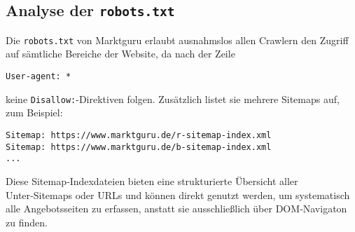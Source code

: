 \subsection{Analyse der \texttt{robots.txt}}
Die \texttt{robots.txt} von Marktguru erlaubt ausnahmslos allen Crawlern den Zugriff auf sämtliche Bereiche der Website, da nach der Zeile
\begin{verbatim}
User-agent: *
\end{verbatim}
keine \texttt{Disallow:}-Direktiven folgen. Zusätzlich listet sie mehrere Sitemaps auf, zum Beispiel:
\begin{verbatim}
Sitemap: https://www.marktguru.de/r-sitemap-index.xml
Sitemap: https://www.marktguru.de/b-sitemap-index.xml
...
\end{verbatim}
Diese Sitemap‑Indexdateien bieten eine strukturierte Übersicht aller Unter‑Sitemaps oder URLs und können direkt genutzt werden, um systematisch alle Angebotsseiten zu erfassen, anstatt sie ausschließlich über DOM‑Navigaton zu finden.


\cleardoublepage


